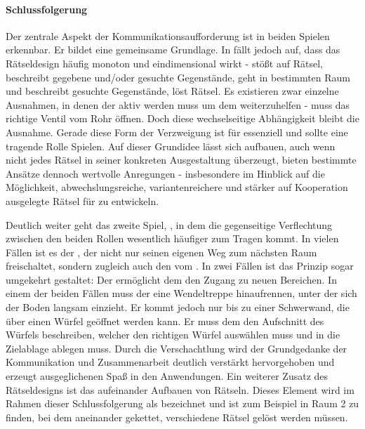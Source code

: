 \paragraph{Schlussfolgerung}
Der zentrale Aspekt der Kommunikationsaufforderung ist in beiden Spielen erkennbar. Er bildet eine gemeinsame Grundlage. In  fällt jedoch auf, dass das Rätseldesign häufig monoton und eindimensional wirkt -  stößt auf Rätsel, beschreibt gegebene und/oder gesuchte Gegenstände,  geht in bestimmten Raum und beschreibt gesuchte Gegenstände,  löst Rätsel. Es existieren zwar einzelne Ausnahmen, in denen der  aktiv werden muss um dem  weiterzuhelfen -  muss das richtige Ventil vom Rohr öffnen. Doch diese wechselseitige Abhängigkeit bleibt die Ausnahme. Gerade diese Form der Verzweigung ist für  essenziell und sollte eine tragende Rolle Spielen. Auf dieser Grundidee lässt sich aufbauen, auch wenn nicht jedes Rätsel in seiner konkreten Ausgestaltung überzeugt, bieten bestimmte Ansätze dennoch wertvolle Anregungen - insbesondere im Hinblick auf die Möglichkeit, abwechslungsreiche, variantenreichere und stärker auf Kooperation ausgelegte Rätsel für  zu entwickeln.

Deutlich weiter geht das zweite Spiel, , in dem die gegenseitige Verflechtung zwischen den beiden Rollen wesentlich häufiger zum Tragen kommt. In vielen Fällen ist es der , der nicht nur seinen eigenen Weg zum nächsten Raum freischaltet, sondern zugleich auch den vom . In zwei Fällen ist das Prinzip sogar umgekehrt gestaltet: Der  ermöglicht dem  den Zugang zu neuen Bereichen. In einem der beiden Fällen muss der  eine Wendeltreppe hinaufrennen, unter der sich der Boden langsam einzieht. Er kommt jedoch nur bis zu einer Schwerwand, die über einen Würfel geöffnet werden kann. Er muss dem  den Aufschnitt des Würfels beschreiben, welcher den richtigen Würfel auswählen muss und in die Zielablage ablegen muss. Durch die Verschachtlung wird der Grundgedanke der Kommunikation und Zusammenarbeit deutlich verstärkt hervorgehoben und erzeugt ausgeglichenen Spaß in den Anwendungen. Ein weiterer Zusatz des Rätseldesigns ist das aufeinander Aufbauen von Rätseln. Dieses Element wird im Rahmen dieser Schlussfolgerung als  bezeichnet und ist zum Beispiel in Raum 2 zu finden, bei dem aneinander gekettet, verschiedene Rätsel gelöst werden müssen.

